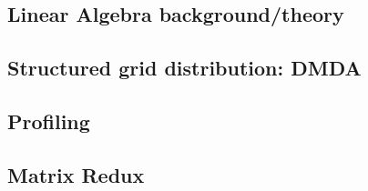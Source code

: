 \documentclass{beamer}
\begin{document}
\subsection{Linear Algebra background/theory}







\subsection{Structured grid distribution: DMDA}













\subsection{Profiling}





\subsection{Matrix Redux}






\end{document}
